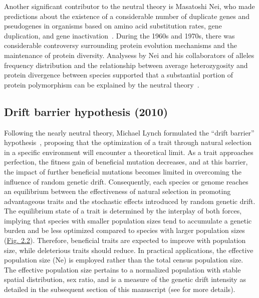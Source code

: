 Another significant contributor to the neutral theory is Masatoshi Nei, who made predictions about the existence of a considerable number of duplicate genes and pseudogenes in organisms based on amino acid \gls{substitution} rates, gene duplication, and gene inactivation~\citep{nei_gene_1969, nei_genetic_1984}. During the 1960s and 1970s, there was considerable controversy surrounding protein evolution mechanisms and the maintenance of protein diversity. Analysess by Nei and his collaborators of alleles frequency distribution and the relationship between average heterozygosity and protein divergence between species supported that a substantial portion of protein polymorphism can be explained by the neutral theory~\citep{nei_neutral_2010, zhang_masatoshi_2023}.

\subsection{Drift barrier hypothesis (2010)}

Following the nearly neutral theory, Michael Lynch formulated the “drift barrier” hypothesis~\citep{lynch_frailty_2007, lynch_evolution_2010}, proposing that the optimization of a trait through natural selection in a specific environment will encounter a theoretical limit. As a trait approaches perfection, the fitness gain of beneficial mutation decreases, and at this barrier, the impact of further beneficial mutations becomes limited in overcoming the influence of random \gls{genetic drift}. Consequently, each species or genome reaches an equilibrium between the effectiveness of natural selection in promoting advantageous traits and the stochastic effects introduced by random \gls{genetic drift}. The equilibrium state of a trait is determined by the interplay of both forces, implying that species with smaller population sizes tend to accumulate a genetic burden and be less optimized compared to species with larger population sizes (\hyperref[fig:drift_selection]{Fig. 2.2}). Therefore, beneficial traits are expected to improve with population size, while deleterious traits should reduce. 
In practical applications, the \gls{effective population size} (\acrshort{Ne}) is employed rather than the total census population size. The \gls{effective population size} pertains to a normalized population with stable spatial distribution, sex ratio, and is a measure of the \gls{genetic drift} intensity as detailed in the subsequent section of this manuscript (see  for more details).


